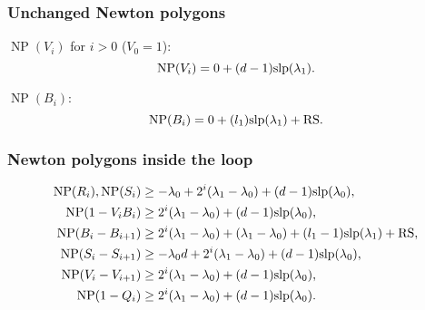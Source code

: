 \documentclass{sig-alternate-2013}
\DeclareMathOperator{\NP}{NP}
\newcommand{\slp}{\text{\rm slp}}
\newcommand{\RS}{\text{\rm RS}}
\begin{document}
\subsubsection{Unchanged Newton polygons}




\begin{lem}
$\NP (V_i)$ for $i>0$ ($V_0=1$):
\[\NP(V_i)=0+(d-1)\slp( \lambda_1). \]


$\NP (B_i)$:
\[\NP(B_i)=0+(l_1)\slp( \lambda_1)+\RS. \]

\end{lem}

\subsubsection{Newton polygons inside the loop}

\begin{lem}
\begin{align*}
\NP (R_i), \NP(S_i) & \geq -\lambda_0+2^i(\lambda_1-\lambda_0)+(d-1) \slp (\lambda_0), \\
\NP (1-V_i B_i) & \geq 2^i (\lambda_1-\lambda_0)+(d-1) \slp (\lambda_0),\\
\NP (B_i-B_{i+1}) & \geq 2^i (\lambda_1-\lambda_0)+(\lambda_1-\lambda_0)+(l_1-1) \slp (\lambda_1)+\RS, \\
\NP (S_i-S_{i+1}) & \geq -\lambda_0 d+2^i (\lambda_1-\lambda_0)+(d-1) \slp (\lambda_0),\\
\NP (V_i-V_{i+1}) & \geq 2^i (\lambda_1-\lambda_0)+(d-1) \slp (\lambda_0),\\
\NP (1-Q_i) & \geq  2^i (\lambda_1-\lambda_0)+(d-1) \slp (\lambda_0).\\
\end{align*}
\end{lem}
\end{document}
